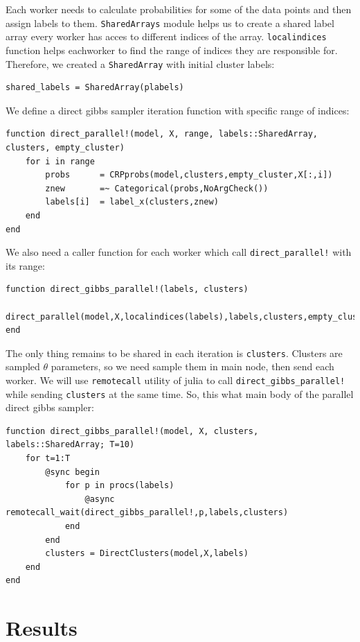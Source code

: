 \documentclass[a4paper]{article}
\begin{document}
Each worker needs to calculate probabilities for some of the data points
and then assign labels to them. \texttt{SharedArrays} module helps us to
create a shared label array every worker has acces to different indices
of the array. \texttt{localindices} function helps eachworker to find
the range of indices they are responsible for. Therefore, we created a
\texttt{SharedArray} with initial cluster labels:
\begin{lstlisting}
shared_labels = SharedArray(plabels)
\end{lstlisting}

We define a direct gibbs sampler iteration function with specific range
of indices:
\begin{lstlisting}[linewidth=17cm]
function direct_parallel!(model, X, range, labels::SharedArray, clusters, empty_cluster)
    for i in range
        probs      = CRPprobs(model,clusters,empty_cluster,X[:,i])
        znew       =~ Categorical(probs,NoArgCheck())
        labels[i]  = label_x(clusters,znew)
    end
end
\end{lstlisting}

We also need a caller function for each worker which call
\texttt{direct\_parallel!} with its range:
\begin{lstlisting}
function direct_gibbs_parallel!(labels, clusters) 		   			
    direct_parallel(model,X,localindices(labels),labels,clusters,empty_cluster)
end 
\end{lstlisting}


The only thing remains to be shared in each iteration is
\texttt{clusters}. Clusters are sampled \(\theta\) parameters, so we
need sample them in main node, then send each worker. We will use
\texttt{remotecall} utility of julia to call
\texttt{direct\_gibbs\_parallel!} while sending \texttt{clusters} at the
same time. So, this what main body of the parallel direct gibbs sampler:

\begin{lstlisting}
function direct_gibbs_parallel!(model, X, clusters, labels::SharedArray; T=10)
    for t=1:T
        @sync begin
            for p in procs(labels)
                @async remotecall_wait(direct_gibbs_parallel!,p,labels,clusters)
            end
        end
        clusters = DirectClusters(model,X,labels)
    end
end
\end{lstlisting}



\section{Results}
\end{document}
